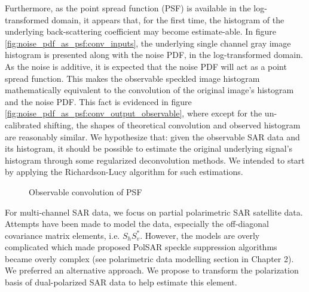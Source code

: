 Furthermore, as the point spread function (PSF) is available in the log-transformed domain, it appears that, for the first time, the histogram of the underlying back-scattering coefficient may become estimate-able. 
In figure 
	\ref{fig:noise_pdf_as_psf:conv_inputs}, 
the underlying single channel gray image histogram is presented along with the noise PDF, in the log-transformed domain. 
As the noise is additive, it is expected that the noise PDF will act as a point spread function.
This makes the observable speckled image histogram mathematically equivalent to the convolution of the original image's histogram and the noise PDF.
This fact is evidenced in figure 
	\ref{fig:noise_pdf_as_psf:conv_output_observable}, 
where except for the un-calibrated shifting, the shapes of theoretical convolution and observed histogram are reasonably similar.
We hypothesize that: given the observable SAR data and its histogram, it should be possible to estimate the original underlying signal's histogram through some regularized deconvolution methods.
We intended to start by applying the Richardson-Lucy algorithm \cite{Richardson_1972_JOptSocAm, Lucy_1974_JAstronomical} for such estimations.

\begin{figure}[h!]
\centering
	\hfill
\caption{Observable convolution of PSF}
\label{fig:noise_pdf_as_psf}
\end{figure}
  
For multi-channel SAR data, we focus on partial polarimetric SAR satellite data.
Attempts have been made to model the data, especially the off-diagonal covariance matrix elements, i.e. $S_hS_v^*$.
However, the models are overly complicated which made proposed PolSAR speckle suppression algorithms became overly complex (see polarimetric data modelling section in Chapter 2).
We preferred an alternative approach.
We propose to transform the polarization basis of dual-polarized SAR data to help estimate this element.

